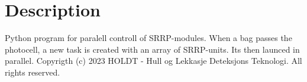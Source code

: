 \chapter{Description}
\hypertarget{index}{}\label{index}
Python program for paralell controll of SRRP-\/modules. When a bag passes the photocell, a new task is created with an array of SRRP-\/units. It\textquotesingle{}s then launced in parallel. Copyrigth (c) 2023 HOLDT -\/ Hull og Lekkasje Deteksjons Teknologi. All rights reserved. 